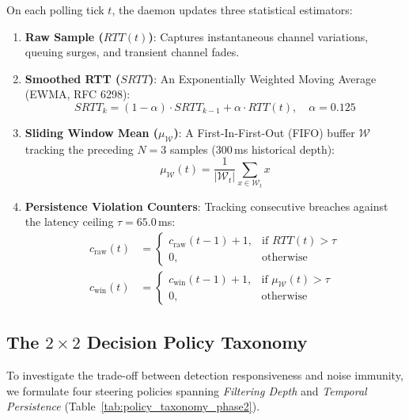 On each polling tick $t$, the daemon updates three statistical estimators:
\begin{enumerate}
    \item \textbf{Raw Sample ($RTT(t)$)}: Captures instantaneous channel variations, queuing surges, and transient channel fades.
    \item \textbf{Smoothed RTT ($SRTT$)}: An Exponentially Weighted Moving Average (EWMA, RFC 6298):
    \begin{equation}
    SRTT_k = (1 - \alpha) \cdot SRTT_{k-1} + \alpha \cdot RTT(t), \quad \alpha = 0.125
    \end{equation}
    \item \textbf{Sliding Window Mean ($\mu_{\mathcal{W}}$)}: A First-In-First-Out (FIFO) buffer $\mathcal{W}$ tracking the preceding $N = 3$ samples ($300$\,ms historical depth):
    \begin{equation}
    \mu_{\mathcal{W}}(t) = \frac{1}{|\mathcal{W}_t|} \sum_{x \in \mathcal{W}_t} x
    \end{equation}
    \item \textbf{Persistence Violation Counters}: Tracking consecutive breaches against the latency ceiling $\tau = 65.0$\,ms:
    \begin{align}
    c_{\text{raw}}(t) &= 
    \begin{cases}
    c_{\text{raw}}(t-1) + 1, & \text{if } RTT(t) > \tau \\
    0, & \text{otherwise}
    \end{cases} \\
    c_{\text{win}}(t) &= 
    \begin{cases}
    c_{\text{win}}(t-1) + 1, & \text{if } \mu_{\mathcal{W}}(t) > \tau \\
    0, & \text{otherwise}
    \end{cases}
    \end{align}
\end{enumerate}

\subsection{The $2 \times 2$ Decision Policy Taxonomy}
\label{subsec:policy_taxonomy}

To investigate the trade-off between detection responsiveness and noise immunity, we formulate four steering policies spanning \emph{Filtering Depth} and \emph{Temporal Persistence} (Table~\ref{tab:policy_taxonomy_phase2}).

